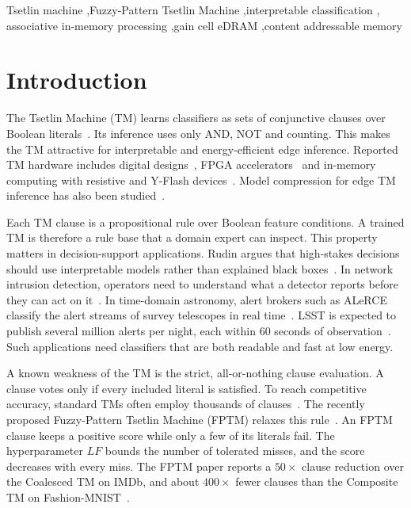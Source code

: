 \documentclass[preprint,review,12pt]{elsarticle}
\newcommand{\LF}{\mathit{LF}}
\begin{document}
\begin{frontmatter}
\begin{keyword}
Tsetlin machine \sep Fuzzy-Pattern Tsetlin Machine \sep interpretable classification \sep
associative in-memory processing \sep gain cell eDRAM \sep content addressable memory
\end{keyword}
\end{frontmatter}

\section{Introduction}\label{sec:intro}

The Tsetlin Machine (TM) learns classifiers as sets of conjunctive clauses over Boolean literals~\cite{granmo2018tsetlin}.
Its inference uses only AND, NOT and counting.
This makes the TM attractive for interpretable and energy-efficient edge inference.
Reported TM hardware includes digital designs~\cite{wheeldon2020learning}, FPGA accelerators~\cite{tunheim2025fpga} and in-memory computing with resistive and Y-Flash devices~\cite{ghazal2023imbue,ghazal2025impact}.
Model compression for edge TM inference has also been studied~\cite{maheshwari2023redress}.

Each TM clause is a propositional rule over Boolean feature conditions.
A trained TM is therefore a rule base that a domain expert can inspect.
This property matters in decision-support applications.
Rudin argues that high-stakes decisions should use interpretable models rather than explained black boxes~\cite{rudin2019stop}.
In network intrusion detection, operators need to understand what a detector reports before they can act on it~\cite{sommer2010outside}.
In time-domain astronomy, alert brokers such as ALeRCE classify the alert streams of survey telescopes in real time~\cite{forster2021alerce}.
LSST is expected to publish several million alerts per night, each within 60 seconds of observation~\cite{ivezic2019lsst}.
Such applications need classifiers that are both readable and fast at low energy.

A known weakness of the TM is the strict, all-or-nothing clause evaluation.
A clause votes only if every included literal is satisfied.
To reach competitive accuracy, standard TMs often employ thousands of clauses~\cite{hnilov2025fptm}.
The recently proposed Fuzzy-Pattern Tsetlin Machine (FPTM) relaxes this rule~\cite{hnilov2025fptm}.
An FPTM clause keeps a positive score while only a few of its literals fail. The hyperparameter $\LF$ bounds the number of tolerated misses, and the score decreases with every miss.
The FPTM paper reports a $50\times$ clause reduction over the Coalesced TM on IMDb, and about $400\times$ fewer clauses than the Composite TM on Fashion-MNIST~\cite{hnilov2025fptm}.
\end{document}
